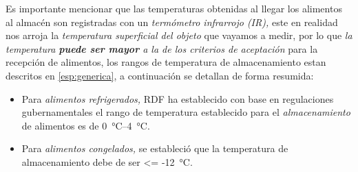 \begin{note}
	Es importante mencionar que las temperaturas obtenidas al llegar los alimentos al almacén son registradas con un \emph{termómetro infrarrojo (IR),} este en realidad nos arroja la \emph{temperatura superficial del objeto} que vayamos a medir, por lo que \emph{la temperatura \textbf{puede ser mayor} a la de los criterios de aceptación} para la recepción de alimentos, los rangos de temperatura de almacenamiento estan descritos en \cref{esp:generica}, a continuación se detallan de forma resumida:
	\begin{itemize}
		\item Para \emph{alimentos refrigerados,} \gls{RDF} ha establecido con base en regulaciones gubernamentales el rango de temperatura establecido para el \emph{almacenamiento} de alimentos es de \qtyrange{0}{4}{\degreeCelsius}.
		\item Para \emph{alimentos congelados,} se estableció que la temperatura de almacenamiento debe de ser \qty{<= -12}{\degreeCelsius}.
	\end{itemize}
\end{note}
